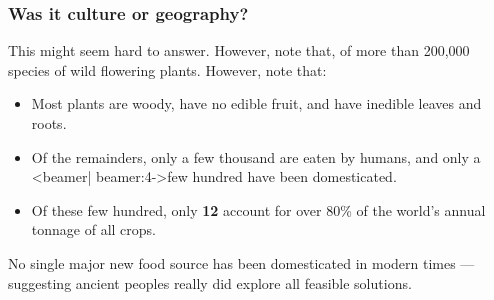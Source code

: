 
\begin{frame}
 \frametitle{Was it culture or geography?}

 This might seem hard to answer. However, note that, of more than 200,000 species
 of wild flowering plants.  However, note that:
 \begin{itemize}
 \item<2-> Most plants are woody, have no
           edible fruit, and have inedible
           leaves and roots.
 \item<3-> Of the remainders, only a \alert<beamer| beamer:4->{few
     thousand} are eaten by humans, and only a \alert<beamer|
   beamer:4->{few hundred} have been domesticated.
 \item<5-> Of these few hundred, only \textbf{12} account for over 80\%
   of the world's annual tonnage of all crops.
 \end{itemize}
 No single major new food source has been domesticated in modern
 times --- suggesting ancient peoples really did explore all feasible
 solutions.   
\end{frame}

